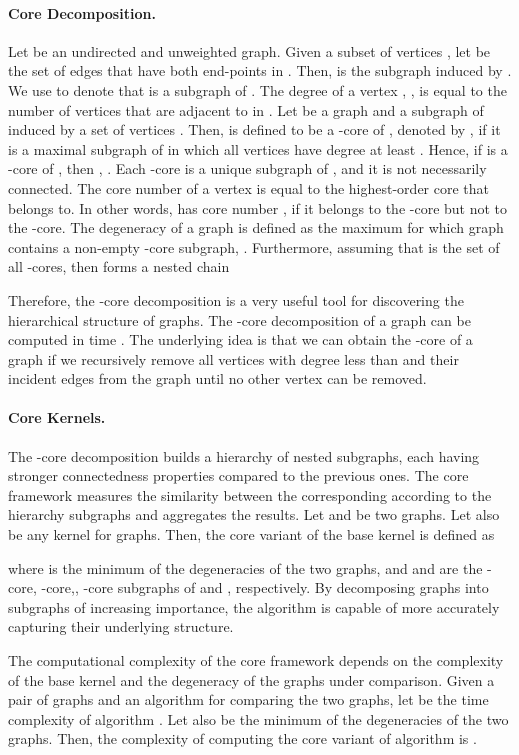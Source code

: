 \documentclass[twoside,11pt]{article}
\begin{document}
\paragraph{Core Decomposition.}
Let  be an undirected and unweighted graph.
Given a subset of vertices , let  be the set of edges that have both end-points in .
Then,  is the subgraph induced by .
We use  to denote that  is a subgraph of .
The degree of a vertex , , is equal to the number of vertices that are adjacent to  in .
Let  be a graph and  a subgraph of  induced by a set of vertices .
Then,  is defined to be a -core of , denoted by , if it is a maximal subgraph of  in which all vertices have degree at least .
Hence, if  is a -core of , then , .
Each -core is a unique subgraph of , and it is not necessarily connected.
The core number  of a vertex  is equal to the highest-order core that  belongs to.
In other words,  has core number , if it belongs to the -core but not to the -core.
The degeneracy  of a graph  is defined as the maximum  for which graph  contains a non-empty -core subgraph, .
Furthermore, assuming that  is the set of all -cores, then  forms a nested chain

Therefore, the -core decomposition is a very useful tool for discovering the hierarchical structure of graphs.
The -core decomposition of a graph can be computed in  time \cite{matula1983smallest,batagelj2011fast}. 
The underlying idea is that we can obtain the -core of a graph if we recursively remove all vertices with degree less than  and their incident edges from the graph until no other vertex can be removed.

\paragraph{Core Kernels.}
The -core decomposition builds a hierarchy of nested subgraphs, each having stronger connectedness properties compared to the previous ones.
The core framework measures the similarity between the corresponding according to the hierarchy subgraphs and aggregates the results.
Let  and  be two graphs.
Let also  be any kernel for graphs.
Then, the core variant of the base kernel  is defined as

where  is the minimum of the degeneracies of the two graphs, and  and  are the -core, -core,, -core subgraphs of  and , respectively.
By decomposing graphs into subgraphs of increasing importance, the algorithm is capable of more accurately capturing their underlying structure.

The computational complexity of the core framework depends on the complexity of the base kernel and the degeneracy of the graphs under comparison.
Given a pair of graphs  and an algorithm  for comparing the two graphs, let  be the time complexity of algorithm .
Let also  be the minimum of the degeneracies of the two graphs.
Then, the complexity of computing the core variant of algorithm  is .
\end{document}
